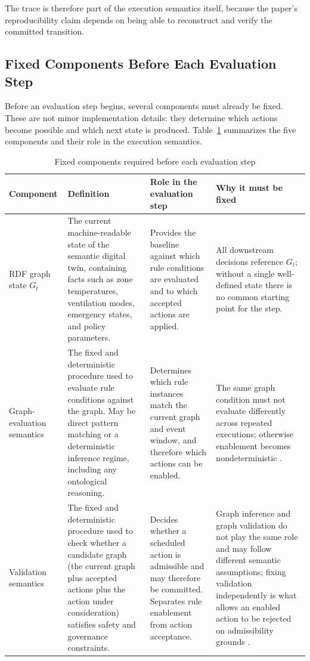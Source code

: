 \documentclass{ieeeaccess}
\theoremstyle{definition}
\theoremstyle{plain}
\theoremstyle{remark}
\begin{document}
The trace is therefore part of the execution semantics itself, because the paper's reproducibility claim depends on being able to reconstruct and verify the committed transition.

\subsection{Fixed Components Before Each Evaluation Step}

Before an evaluation step begins, several components must already be fixed. These are not minor implementation details: they determine which actions become possible and which next state is produced. Table~\ref{tab:fixed-components} summarizes the five components and their role in the execution semantics.

\begin{table}[h]
\caption{Fixed components required before each evaluation step}
\label{tab:fixed-components}
\centering
\begin{tabular}{|p{2.6cm}|p{5.2cm}|p{4.3cm}|p{4.0cm}|}
\hline
\textbf{Component} & \textbf{Definition} & \textbf{Role in the evaluation step} & \textbf{Why it must be fixed} \\
\hline
RDF graph state $G_t$ & The current machine-readable state of the semantic digital twin, containing facts such as zone temperatures, ventilation modes, emergency states, and policy parameters. & Provides the baseline against which rule conditions are evaluated and to which accepted actions are applied. & All downstream decisions reference $G_t$; without a single well-defined state there is no common starting point for the step. \\
\hline
Graph-evaluation semantics & The fixed and deterministic procedure used to evaluate rule conditions against the graph. May be direct pattern matching or a deterministic inference regime, including any ontological reasoning. & Determines which rule instances match the current graph and event window, and therefore which actions can be enabled. & The same graph condition must not evaluate differently across repeated executions; otherwise enablement becomes nondeterministic \cite{Corman2018RecursiveSHACL,Oudshoorn2026SHACLValidationOntologies}. \\
\hline
Validation semantics & The fixed and deterministic procedure used to check whether a candidate graph (the current graph plus accepted actions plus the action under consideration) satisfies safety and governance constraints. & Decides whether a scheduled action is admissible and may therefore be committed. Separates rule enablement from action acceptance. & Graph inference and graph validation do not play the same role and may follow different semantic assumptions; fixing validation independently is what allows an enabled action to be rejected on admissibility grounds \cite{Corman2018RecursiveSHACL,Oudshoorn2026SHACLValidationOntologies}. \\

\end{tabular}
\end{table}
\end{document}
